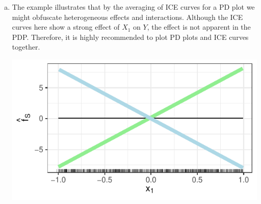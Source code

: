 {\begin{enumerate} [a)]
  The light green dots correspond to group $X_2 = 1$, the light blue dots to group $X_2 = 0$.
  
   \item
   The example illustrates that by the averaging of ICE curves for a PD plot we might obfuscate heterogeneous effects and interactions. 
   Although the ICE curves here show a strong effect of $X_1$ on $Y$, the effect is not apparent in the PDP.
   Therefore, it is highly recommended to plot PD plots and ICE curves together. 

\begin{center}
  \includegraphics[width=\maxwidth]{figure/pdpinteraction_ICE_curve_sol.pdf}
\end{center}

  
\end{enumerate}
}